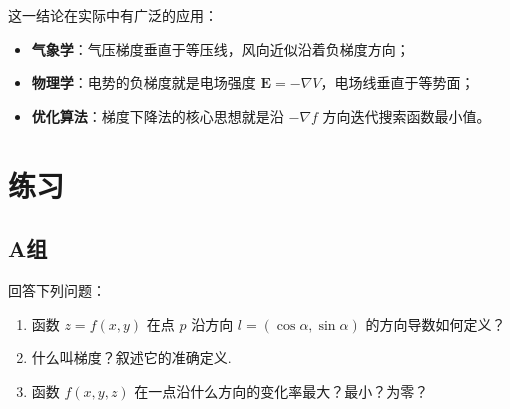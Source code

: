 \documentclass[lang=cn,11pt]{elegantbook}
\begin{document}
这一结论在实际中有广泛的应用：
\begin{itemize}
  \item \textbf{气象学}：气压梯度垂直于等压线，风向近似沿着负梯度方向；
  \item \textbf{物理学}：电势的负梯度就是电场强度 $\boldsymbol E=-\nabla V$，电场线垂直于等势面；
  \item \textbf{优化算法}：梯度下降法的核心思想就是沿 $-\nabla f$ 方向迭代搜索函数最小值。
\end{itemize}


\section{练习}

\subsection{A组}

\begin{exercise}[基本概念问答]
回答下列问题：
\begin{enumerate}
  \item[(1)] 函数 $z=f(x,y)$ 在点 $p$ 沿方向 $l=(\cos\alpha,\sin\alpha)$ 的方向导数如何定义？
  \item[(2)] 什么叫梯度？叙述它的准确定义.
  \item[(3)] 函数 $f(x,y,z)$ 在一点沿什么方向的变化率最大？最小？为零？
\end{enumerate}
\end{exercise}
\end{document}
